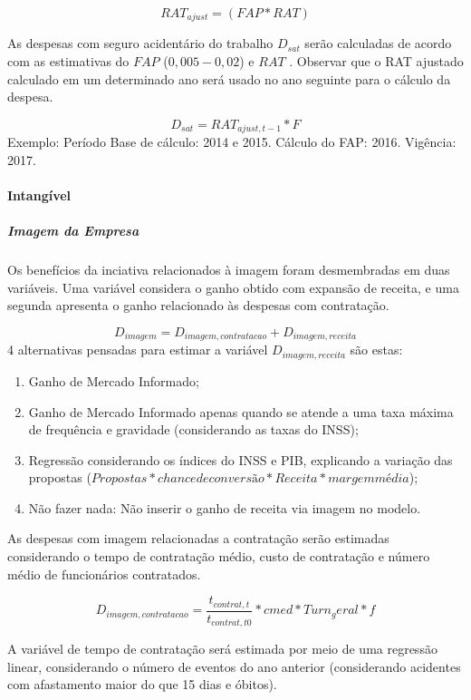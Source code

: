\documentclass[]{article}
\let\oldparagraph\paragraph
\renewcommand{\paragraph}[1]{\oldparagraph{#1}\mbox{}}
\let\oldsubparagraph\subparagraph
\renewcommand{\subparagraph}[1]{\oldsubparagraph{#1}\mbox{}}
\begin{document}
\[RAT_{ajust} = (FAP * RAT)\]

As despesas com seguro acidentário do trabalho \(D_{sat}\) serão
calculadas de acordo com as estimativas do \(FAP\) (\(0,005 - 0,02\)) e
\(RAT\) . Observar que o RAT ajustado calculado em um determinado ano
será usado no ano seguinte para o cálculo da despesa.

\[D_{sat} = RAT_{ajust,t-1}* F\] Exemplo: Período Base de cálculo: 2014
e 2015. Cálculo do FAP: 2016. Vigência: 2017.

\paragraph{Intangível}\label{intangivel}

\subparagraph{Imagem da Empresa}\label{imagem-da-empresa}

Os benefícios da inciativa relacionados à imagem foram desmembradas em
duas variáveis. Uma variável considera o ganho obtido com expansão de
receita, e uma segunda apresenta o ganho relacionado às despesas com
contratação.

\[D_{imagem}  = D_{imagem, contratacao} + D_{imagem, receita}\] 4
alternativas pensadas para estimar a variável \(D_{imagem, receita}\)
são estas:

\begin{enumerate}
\def\labelenumi{\Alph{enumi})}
\item
  Ganho de Mercado Informado;
\item
  Ganho de Mercado Informado apenas quando se atende a uma taxa máxima
  de frequência e gravidade (considerando as taxas do INSS);
\item
  Regressão considerando os índices do INSS e PIB, explicando a variação
  das propostas
  (\(Propostas * chance de conversão * Receita * margem média\));
\item
  Não fazer nada: Não inserir o ganho de receita via imagem no modelo.
\end{enumerate}

As despesas com imagem relacionadas a contratação serão estimadas
considerando o tempo de contratação médio, custo de contratação e número
médio de funcionários contratados.

\[D_{imagem, contratacao} =  \frac{t_{contrat,t}}{t_{contrat,t0}} * cmed * Turn_geral * f\]

A variável de tempo de contratação será estimada por meio de uma
regressão linear, considerando o número de eventos do ano anterior
(considerando acidentes com afastamento maior do que 15 dias e óbitos).
\end{document}

